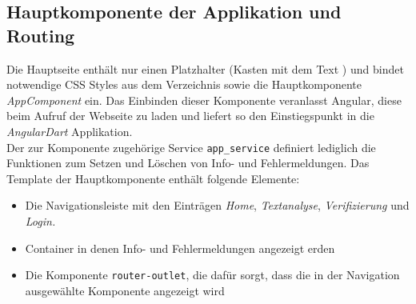 \subsection{Hauptkomponente der Applikation und Routing}

Die Hauptseite  enthält nur einen Platzhalter (Kasten mit dem Text ) und bindet notwendige CSS Styles aus dem  Verzeichnis sowie die Hauptkomponente \textit{AppComponent} ein. Das Einbinden dieser Komponente veranlasst Angular, diese beim Aufruf der Webseite zu laden und liefert so den Einstiegspunkt in die \textit{AngularDart} Applikation.\\

Der zur Komponente zugehörige Service \texttt{app\_service} definiert lediglich die Funktionen zum Setzen und Löschen von Info- und Fehlermeldungen. Das Template der Hauptkomponente  enthält folgende Elemente:
\begin{itemize}
	\item Die Navigationsleiste mit den Einträgen \textit{Home}, \textit{Textanalyse}, \textit{Verifizierung} und \textit{Login.}
	
	\item Container in denen Info- und Fehlermeldungen angezeigt erden
	\item Die Komponente \texttt{router-outlet}, die dafür sorgt, dass die in der Navigation ausgewählte Komponente angezeigt wird
\end{itemize}

